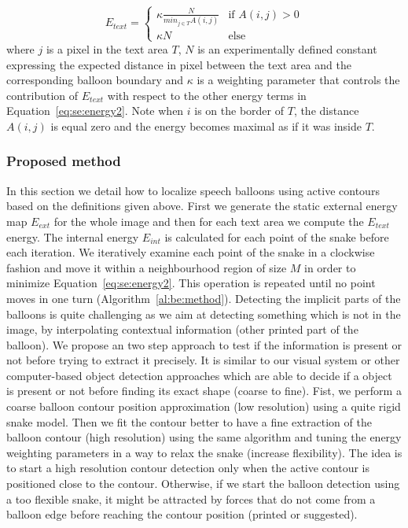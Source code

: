 \begin{equation}\label{eq:se:know}
E_{text} = \begin{cases} \kappa \frac{N}{min_{j \in T} A(i,j)} & \mbox{if } A(i,j) > 0 \\ \kappa N & \mbox{else} \end{cases}
\end{equation}
where $j$ is a pixel in the text area $T$, $N$ is an experimentally defined constant expressing the expected distance in pixel between the text area and the corresponding balloon boundary and $\kappa$ is a weighting parameter that controls the contribution of $E_{text}$ with respect to the other energy terms in Equation~\ref{eq:se:energy2}. Note when $i$ is on the border of $T$, the distance $A(i,j)$ is equal zero and the energy becomes maximal as if it was inside $T$.


\subsubsection{Proposed method}
\label{sec:proposed_method}

In this section we detail how to localize speech balloons using active contours based on the definitions given above. 
First we generate the static external energy map $E_{ext}$ for the whole image and then for each text area we compute the $E_{text}$ energy.
The internal energy $E_{int}$ is calculated for each point of the snake before each iteration.
We iteratively examine each point of the snake in a clockwise fashion and move it within a neighbourhood region of size $M$ in order to minimize Equation~\ref{eq:se:energy2}.
This operation is repeated until no point moves in one turn (Algorithm~\ref{al:be:method}).
Detecting the implicit parts of the balloons is quite challenging as we aim at detecting something which is not in the image, by interpolating contextual information (other printed part of the balloon).
We propose an two step approach to test if the information is present or not before trying to extract it precisely.
It is similar to our visual system or other computer-based object detection approaches which are able to decide if a object is present or not before finding its exact shape (coarse to fine).
Fist, we perform a coarse balloon contour position approximation (low resolution) using a quite rigid snake model.
Then we fit the contour better to have a fine extraction of the balloon contour (high resolution) using the same algorithm and tuning the energy weighting parameters in a way to relax the snake (increase flexibility).
The idea is to start a high resolution contour detection only when the active contour is positioned close to the contour.
Otherwise, if we start the balloon detection using a too flexible snake, it might be attracted by forces that do not come from a balloon edge before reaching the contour position (printed or suggested).

